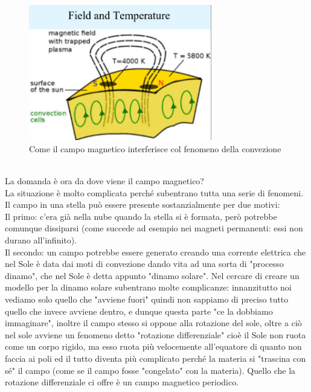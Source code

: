 \documentclass[a4paper,11pt]{article}
\begin{document}
        \begin{figure}[h!!]
            \centering
                \includegraphics[width=8cm]{2dic/ConvezioneMacchie.jpg}
                \caption{Come il campo magnetico interferisce col fenomeno della convezione}
            \label{fig:Convezione}
        \end{figure}
        \\
        \newpage
        La domanda è ora da dove viene il campo magnetico? \\
        La situazione è molto complicata perché subentrano tutta una serie di fenomeni. \\
        Il campo in una stella può essere presente sostanzialmente per due motivi: \\
        Il primo: c'era già nella nube quando la stella si è formata, però potrebbe comunque dissiparsi (come succede ad esempio nei magneti permanenti: essi non durano all'infinito). \\
        Il secondo: un campo potrebbe essere generato creando una corrente elettrica che nel Sole è data dai moti di convezione dando vita ad una sorta di "processo dinamo", che nel Sole è detta appunto "dinamo solare". Nel cercare di creare un modello per la dinamo solare subentrano molte complicanze: innanzitutto noi vediamo solo quello che "avviene fuori" quindi non sappiamo di preciso tutto quello che invece avviene dentro, e dunque questa parte "ce la dobbiamo immaginare", inoltre il campo stesso si oppone alla rotazione del sole, oltre a ciò nel sole avviene un fenomeno detto "rotazione differenziale" cioè il Sole non ruota come un corpo rigido, ma esso ruota più velocemente all'equatore di quanto non faccia ai poli ed il tutto diventa più complicato perché la materia si "trascina con sé" il campo (come se il campo fosse "congelato" con la materia).
        Quello che la rotazione differenziale ci offre è un campo magnetico periodico.
        \\
\end{document}
